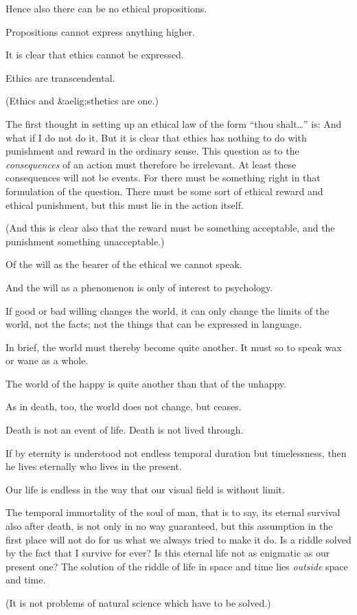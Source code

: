 {Hence also there can be no ethical propositions.

Propositions cannot express anything higher.}


{It is clear that ethics cannot be expressed.

Ethics are transcendental.

(Ethics and &aelig;sthetics are one.)}


{The first thought in setting up an ethical law
of the form ``thou shalt\ldots'' is: And what
if I do not do it. But it is clear that ethics has
nothing to do with punishment and reward in the
ordinary sense. This question as to the \emph{consequences}
of an action must therefore be irrelevant.
At least these consequences will not be events.
For there must be something right in that formulation
of the question. There must be some sort
of ethical reward and ethical punishment, but this
must lie in the action itself.

(And this is clear also that the reward must be
something acceptable, and the punishment something
unacceptable.)}


{Of the will as the bearer of the ethical we cannot
speak.

And the will as a phenomenon is only of interest
to psychology.}


{If good or bad willing changes the world, it
can only change the limits of the world, not the
facts; not the things that can be expressed in
language.

In brief, the world must thereby become quite
another. It must so to speak wax or wane as a
whole.

The world of the happy is quite another than
that of the unhappy.}


{As in death, too, the world does not change,
but ceases.}


{Death is not an event of life. Death is not lived
through.

If by eternity is understood not endless temporal
duration but timelessness, then he lives eternally
who lives in the present.

Our life is endless in the way that our visual
field is without limit.}


{The temporal immortality of the soul of man,
that is to say, its eternal survival also after
death, is not only in no way guaranteed, but
this assumption in the first place will not do
for us what we always tried to make it do.
Is a riddle solved by the fact that I survive for
ever? Is this eternal life not as enigmatic as
our present one? The solution of the riddle of
life in space and time lies \emph{outside} space and
time.

{\stretchyspace
(It is not problems of natural science which have
to be solved.)}}


